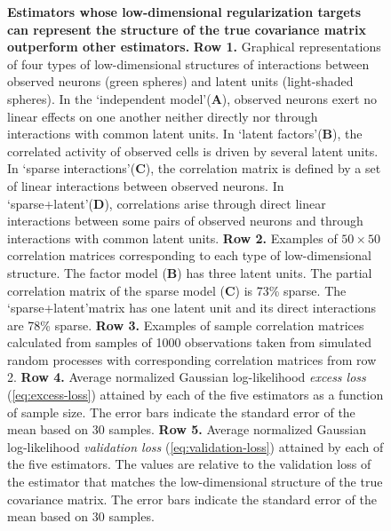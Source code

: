 \documentclass[10pt]{article}
\begin{document}
\begin{figure}[!ht]
    \begin{center}
    \end{center}
    \caption{{\bf Estimators whose low-dimensional regularization targets can represent the structure of the true covariance matrix outperform other estimators.}
        {\bf Row 1.} Graphical representations of four types of low-dimensional structures of interactions between observed neurons (green spheres) and latent units (light-shaded spheres).
        In the \lq independent model\rq\;({\bf A}), observed neurons exert no linear effects on one another neither directly nor through interactions with common latent units. 
        In \lq latent factors\rq\;({\bf B}), the correlated activity of observed cells is driven by several latent units. 
        In \lq sparse interactions\rq\;({\bf C}), the correlation matrix is defined by a set of linear interactions between observed neurons. 
        In \lq sparse+latent\rq\;({\bf D}), correlations arise through direct linear interactions between some pairs of observed neurons and through interactions with common latent units. 
        {\bf Row 2.} Examples of $50\times 50$ correlation matrices corresponding to each type of low-dimensional structure. 
        The factor model ({\bf B}) has three latent units. 
        The partial correlation matrix of the sparse model ({\bf C}) is 73\% sparse.
        The \lq sparse+latent\rq\;matrix has one latent unit and its direct interactions are 78\% sparse.
        {\bf Row 3.} Examples of sample correlation matrices calculated from samples of 1000 observations taken from simulated random processes with corresponding correlation matrices from row 2.
        {\bf Row 4.} Average normalized Gaussian log-likelihood \emph{excess loss} (\ref{eq:excess-loss}) attained by each of the five estimators as a function of sample size. The error bars indicate the standard error of the mean based on 30 samples.
        {\bf Row 5.} Average normalized Gaussian log-likelihood \emph{validation loss} (\ref{eq:validation-loss}) attained by each of the five estimators. The values are relative to the validation loss of the estimator that matches the low-dimensional structure of the true covariance matrix. The error bars indicate the standard error of the mean based on 30 samples.
    }
    \label{fig:02}
\end{figure} 
\end{document}
